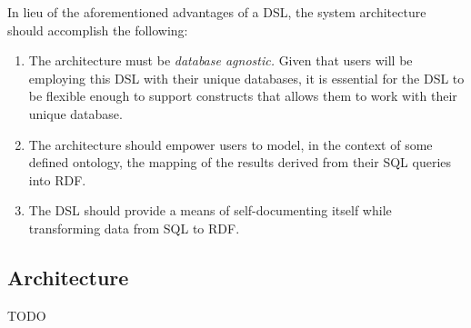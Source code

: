 In lieu of the aforementioned advantages of a DSL, the system architecture should accomplish the following:

\begin{enumerate}
\item The architecture must be \textit{database agnostic.}  Given that users will be employing this DSL with their unique databases, it is essential for the DSL to be flexible enough to support constructs that allows them to work with their unique database.
\item The architecture should empower users to model, in the context of some defined ontology, the mapping of the results derived from their SQL queries into RDF.
\item The DSL should provide a means of self-documenting itself while transforming data from SQL to RDF.
\end{enumerate}

\subsection{Architecture}
TODO

    



